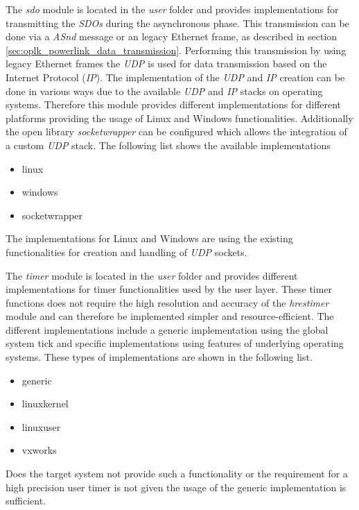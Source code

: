 \begin{description}[leftmargin=1cm]
    \item[sdo] The \emph{sdo} module is located in the \emph{user} folder and provides implementations for transmitting the \emph{SDOs} during the asynchronous phase.
    This transmission can be done via a \emph{ASnd} message or an legacy Ethernet frame, as described in section \ref{sec:oplk_powerlink_data_transmission}.
    Performing this transmission by using legacy Ethernet frames the \emph{UDP} is used for data transmission based on the Internet Protocol (\emph{IP}).
    The implementation of the \emph{UDP} and \emph{IP} creation can be done in various ways due to the available \emph{UDP} and \emph{IP} stacks on operating systems.
    Therefore this module provides different implementations for different platforms providing the usage of Linux and Windows functionalities.
    Additionally the open library \emph{socketwrapper} can be configured which allows the integration of a custom \emph{UDP} stack.
    The following list shows the available implementations
    \begin{multicols}{3}
        \begin{itemize}
            \item linux
            \item windows
            \item socketwrapper
        \end{itemize}
    \end{multicols}
    The implementations for Linux and Windows are using the existing functionalities for creation and handling of \emph{UDP} sockets.\\
    
    
    \item[timer] The \emph{timer} module is located in the \emph{user} folder and provides different implementations for timer functionalities used by the user layer.
    These timer functions does not require the high resolution and accuracy of the \emph{hrestimer} module and can therefore be implemented simpler and resource-efficient.
    The different implementations include a generic implementation using the global system tick and specific implementations using features of underlying operating systems.
    These types of implementations are shown in the following list.
    \begin{multicols}{3}
        \begin{itemize}
            \item generic
            \item linuxkernel
            \item linuxuser
            \item vxworks
        \end{itemize}
    \end{multicols}
    Does the target system not provide such a functionality or the requirement for a high precision user timer is not given the usage of the generic implementation is sufficient.\\
    

\end{description}
